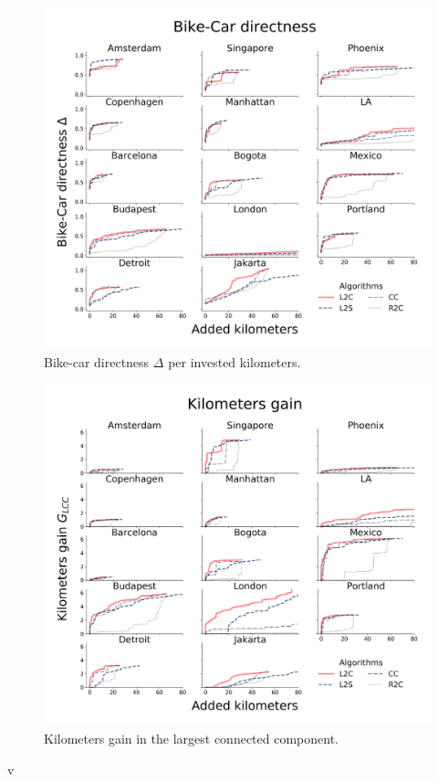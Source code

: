 \begin{figure}[h!]
  \centering
  \includegraphics[width=\textwidth]{images/datadriven/SI_Directness.png}
  \caption{Bike-car directness $\Delta$ per invested kilometers.}
  \label{fig:Directness}
\end{figure}

\begin{figure}[h!]
  \centering
  \includegraphics[width=\textwidth]{images/datadriven/SI_Gain.png}
  \caption{Kilometers gain in the largest connected component.}
  \label{fig:Gain}
\end{figure}
v

